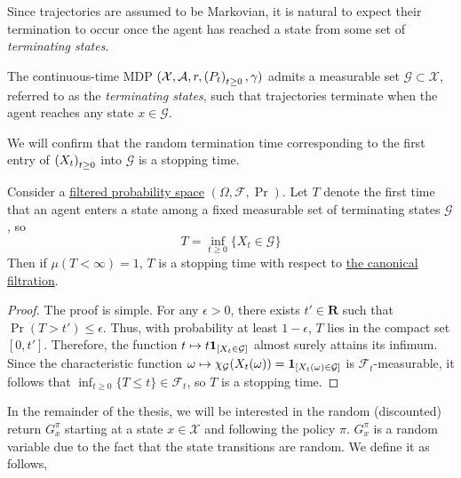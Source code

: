 Since trajectories are assumed to be Markovian, it is natural to
expect their termination to occur once the agent has reached a state
from some set of \textit{terminating states}. 

\begin{assumption}\label{ass:termination-set}
  The continuous-time MDP $(\mathcal{X}, \mathcal{A}, r, \indexedabove{t}{P},
  \gamma)$ admits a measurable set $\mathcal{G}\subset \mathcal{X}$, referred to as the
  \emph{terminating states}, such that trajectories terminate when the agent
  reaches any state $x\in \mathcal{G}$.
\end{assumption}

We will confirm that the random termination time corresponding to the first
entry of $\indexedabove{t}{X}$ into $\mathcal{G}$ is a stopping time.

\begin{proposition}\label{pro:stopping-time}
  Consider a \hyperref[def:filtration]{filtered probability space} $(\Omega, \mathcal{F},
  \Pr)$. Let $T$ denote the first time that an agent enters a state among a
  fixed measurable set of terminating states $\mathcal{G}$, so
  \begin{equation*}
    T = \inf_{t\geq 0}\{X_t \in\mathcal{G}\}
  \end{equation*}
  Then if $\mu(T <\infty) = 1$, $T$ is a stopping time with respect to
  \hyperref[def:canonical-filtration]{the canonical filtration}.
\end{proposition}
\begin{proof}
  The proof is simple. For any $\epsilon>0$, there exists
  $t'\in\mathbf{R}$ such that $\Pr(T> t')\leq\epsilon$. Thus,
  with probability at least $1-\epsilon$, $T$ lies in the compact set
  $[0,t']$. Therefore, the function $t\mapsto
  t\indicator{X_t\in\mathcal{G}}$ almost surely attains its
  infimum. Since the characteristic function
  $\omega\mapsto\characteristic{\mathcal{G}}(X_t(\omega)) =
  \indicator{X_t(\omega)\in\mathcal{G}}$ is
  $\mathcal{F}_t$-measurable, it follows that
  $\inf_{t\geq 0}\{T\leq t\}\in\mathcal{F}_t$, so $T$ is a
  stopping time.
\end{proof}

In the remainder of the thesis, we will be interested in the random
(discounted) return $G_x^\pi$ starting at a state
$x\in\mathcal{X}$ and following the policy $\pi$. $G_x^\pi$ is a
random variable due to the fact that the state transitions are
random. We define it as follows,

